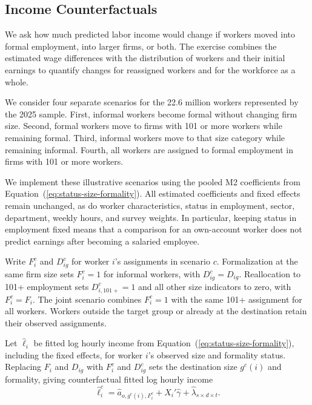 \subsection{Income Counterfactuals}
\label{subsec:income-counterfactual-method}

We ask how much predicted labor income would change if workers moved into formal
employment, into larger firms, or both.
The exercise combines the estimated wage differences with the distribution
of workers and their initial earnings to quantify changes for reassigned
workers and for the workforce as a whole.

We consider four separate scenarios for the 22.6 million workers represented
by the 2025 sample. First, informal workers become formal without changing
firm size. Second, formal workers move to firms with 101 or more workers
while remaining formal. Third, informal workers move to that size category
while remaining informal. Fourth, all workers are assigned to formal
employment in firms with 101 or more workers.

We implement these illustrative scenarios using the pooled M2
coefficients from Equation~(\ref{eq:status-size-formality}). All estimated coefficients and
fixed effects remain unchanged, as do worker characteristics, status in employment, sector, department, weekly hours, and survey weights.
In particular, keeping status in employment fixed means that a comparison for
an own-account worker does not predict earnings after becoming a salaried employee.

Write \(F_i^c\) and \(D_{ig}^c\) for worker \(i\)'s assignments in scenario
\(c\). Formalization at the same firm size sets \(F_i^c=1\) for informal
workers, with \(D_{ig}^c=D_{ig}\). Reallocation to 101+ employment sets
\(D_{i,101+}^c=1\) and all other size indicators to zero, with
\(F_i^c=F_i\). The joint scenario combines \(F_i^c=1\) with the same
101+ assignment for all workers. Workers outside the target group or
already at the destination retain their observed assignments.

Let \(\widehat{\ell}_i\) be fitted log hourly income from
Equation~(\ref{eq:status-size-formality}), including the fixed effects, for worker \(i\)'s
observed size and formality status. Replacing \(F_i\) and \(D_{ig}\) with
\(F_i^c\) and \(D_{ig}^c\) sets the destination size \(g^c(i)\) and formality, giving counterfactual fitted log hourly income
\begin{equation}\label{eq:income-counterfactual-prediction}
  \widehat{\ell}_i^c =
    \widehat a_{o,g^c(i),F_i^c}
    +X_i'\widehat\gamma+\widehat\lambda_{s\times d\times t}.
\end{equation}

